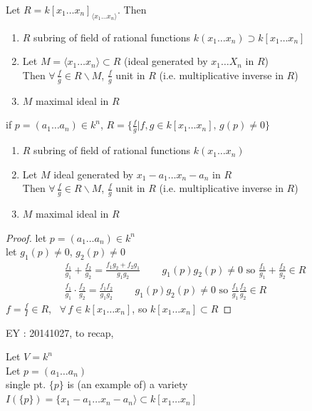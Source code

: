 \begin{proposition}[1.2]
  Let $R= k[x_1 \dots x_n]_{\langle x_1 \dots x_n \rangle }$.  Then
\begin{enumerate}
\item[(a)] $R$ subring of field of rational functions $k(x_1 \dots x_n) \supset k[x_1 \dots x_n]$
\item[(b)] Let $M=\langle x_1 \dots x_n \rangle \subset R$ (ideal generated by $x_1 \dots X_n$ in $R$) \\
Then $\forall \, \frac{f}{g} \in R \backslash M$, $\frac{f}{g}$ unit in $R$ (i.e. multiplicative inverse in $R$)
\item[(c)] $M$ maximal ideal in $R$
\end{enumerate}
\end{proposition}


 if $p=(a_1 \dots a_n) \in k^n$, $R = \lbrace \frac{f}{g} | f,g\in k[x_1 \dots x_n] , \, g(p) \neq 0 \rbrace$ 
\begin{enumerate}
\item[(a)] $R$ subring of field of rational functions $k(x_1 \dots x_n)$ 
\item[(b)] Let $M$ ideal generated by $x_1 - a_1 \dots x_n -a_n$ in $R$  \\
Then $\forall \, \frac{f}{g} \in R\backslash M$, $\frac{f}{g}$ unit in $R$ (i.e. multiplicative inverse in $R$)
\item[(c)]  $M$ maximal ideal in $R$
\end{enumerate}


\begin{proof}
let $p = (a_1 \dots a_n) \in k^n$ \\
let $g_1(p) \neq 0$, $g_2(p) \neq 0$ 
\[
\begin{gathered}
  \frac{f_1}{g_1 } + \frac{f_2}{g_2} = \frac{f_1 g_2 + f_2 g_1}{ g_1 g_2 } \quad \quad \,  g_1(p)g_2(p) \neq 0 \text{ so } \frac{f_1}{g_1} + \frac{f_2}{g_2} \in R \\
 \frac{f_1}{g_1} \cdot \frac{f_2}{g_2} = \frac{f_1 f_2}{g_1 g_2} \quad \quad \, g_1(p) g_2(p) \neq 0 \text{ so } \frac{f_1}{g_1}\frac{f_2}{g_2} \in R
\end{gathered}
\]
$f= \frac{f}{I} \in R$, \quad \, $\forall \, f\in k[x_1 \dots x_n]$, so $k[x_1 \dots x_n]\subset R$

\end{proof}

EY : 20141027, to recap, 

Let $V = k^n$ \\
Let $p = (a_1 \dots a_n)$ \\
single pt. $\lbrace p \rbrace$ is (an example of) a variety \\
$I(\lbrace p \rbrace) = \lbrace x_1 -a_1 \dots x_n -a_n \rangle \subset k[x_1 \dots x_n]$ \\


